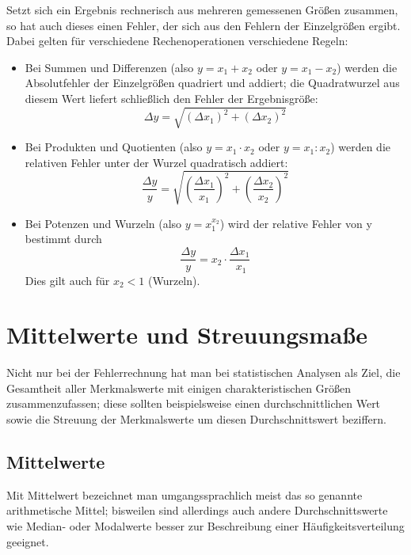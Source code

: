 \documentclass[a4paper]{article}
\begin{document}
Setzt sich ein Ergebnis rechnerisch aus mehreren gemessenen Größen zusammen,
so hat auch dieses einen Fehler, der sich aus den Fehlern der Einzelgrößen
ergibt. Dabei gelten für verschiedene Rechenoperationen verschiedene Regeln:
%
\begin{itemize}

\item Bei Summen und Differenzen (also $y = x_1 + x_2$ oder $y = x_1
-x_2$) werden die Absolutfehler der Einzelgrößen quadriert und addiert;
die Quadratwurzel aus diesem Wert liefert schließlich den Fehler der
Ergebnisgröße:
%
\begin{equation*}
\Delta y = \sqrt{(\Delta x_1)^2 + (\Delta x_2)^2}
\end{equation*}
\item Bei Produkten und Quotienten (also $y = x_1 \cdot x_2$ oder $y
= x_1 : x_2$) werden die relativen Fehler unter der Wurzel quadratisch
addiert:
%
\begin{equation*}
\frac{\Delta y}{y} = \sqrt{\left(\frac{\Delta x_1}{x_1}\right)^2 +
\left(\frac{\Delta x_2}{x_2}\right)^2}
\end{equation*}
\item Bei Potenzen und Wurzeln (also $y = x_1^{x_2}$) wird der relative
Fehler von y bestimmt durch
%
\begin{equation*}
\frac{\Delta y}{y} = x_2 \cdot \frac{\Delta x_1}{\;x_1}
\end{equation*}
Dies gilt auch für $x_2 < 1$ (Wurzeln).

\end{itemize}


\section{Mittelwerte und Streuungsmaße%
  \label{mittelwerte-und-streuungsmasze}%
}

Nicht nur bei der Fehlerrechnung hat man bei statistischen Analysen als Ziel,
die Gesamtheit aller Merkmalswerte mit einigen charakteristischen Größen
zusammenzufassen; diese sollten beispielsweise einen durchschnittlichen Wert
sowie die Streuung der Merkmalswerte um diesen Durchschnittswert beziffern.


\subsection{Mittelwerte%
  \label{id6}%
  \label{mittelwerte}%
}

Mit \textquotedbl{}Mittelwert\textquotedbl{} bezeichnet man umgangssprachlich meist das so genannte
arithmetische Mittel; bisweilen sind allerdings auch andere Durchschnittswerte
wie Median- oder Modalwerte besser zur Beschreibung einer Häufigkeitsverteilung
geeignet.
\end{document}

